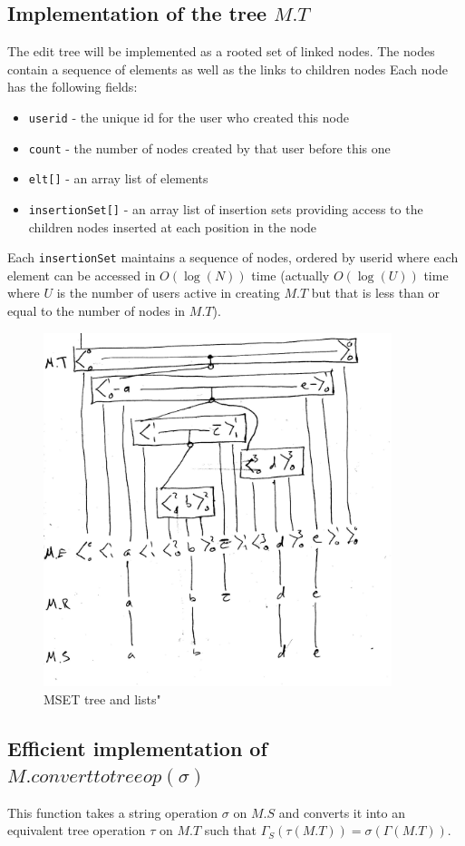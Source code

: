 \documentclass{amsart}
\begin{document}
\subsection{Implementation of the tree $M.T$}
The edit tree will be implemented as a rooted set of linked nodes.
The nodes contain a sequence of elements as well as the links to children nodes
Each node has the following fields:
\begin{itemize}
\item {\tt userid} - the unique id for the user who created this node
\item {\tt count} - the number of nodes created by that user before this one
\item {\tt elt[]} - an array list of elements
\item {\tt insertionSet[]} - an array list of insertion sets providing access to the children nodes inserted at each position in the node
\end{itemize}
Each {\tt insertionSet} maintains a sequence of nodes, ordered by userid where
each element can be accessed in $O(\log(N))$ time (actually $O(\log(U))$ time where $U$ is the number of users active in creating $M.T$ but that is less than or equal to the number of nodes in $M.T$).

\begin{figure}[h]
\centering
\includegraphics[width=4.0in]{MSETfig001.jpg}
\caption{MSET tree and lists\label{fig:MSETtree}"}
\end{figure}


\subsection{Efficient implementation of $M.converttotreeop(\sigma)$}
This function takes a string operation $\sigma$ on $M.S$ and converts it into
an equivalent tree operation 
$\tau$ on $M.T$ such that
$\Gamma_S(\tau(M.T)) = \sigma(\Gamma(M.T))$.
\end{document}
